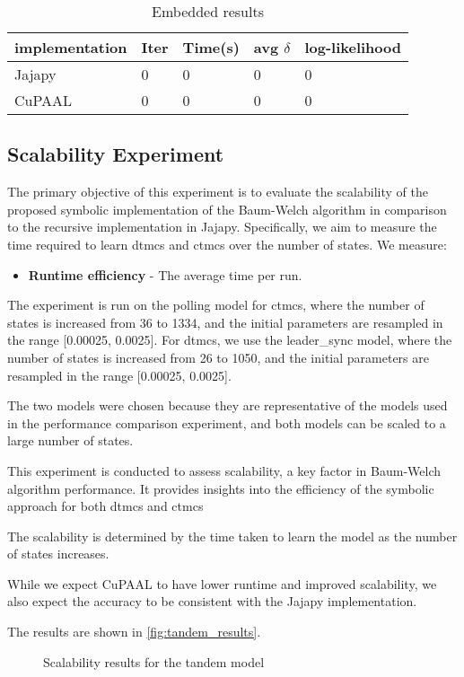 \begin{table}[!htb]
    \centering
    \caption{Embedded results}
    \label{tab:embedded_results}
    \begin{tabular}{lllll}
        \toprule
        implementation & Iter & Time(s) & avg $\delta$ & log-likelihood \\
        \midrule
        Jajapy         & 0    & 0       & 0            & 0              \\
        CuPAAL         & 0    & 0       & 0            & 0              \\
        \bottomrule
    \end{tabular}
\end{table}


\subsection{Scalability Experiment}
The primary objective of this experiment is to evaluate the scalability of the proposed symbolic implementation of the Baum-Welch algorithm in comparison to the recursive implementation in Jajapy. Specifically, we aim to measure the time required to learn \glspl{dtmc} and \glspl{ctmc} over the number of states.
We measure:
\begin{itemize}
    \item \textbf{Runtime efficiency} - The average time per run.
\end{itemize}

The experiment is run on the polling model for \glspl{ctmc}, where the number of states is increased from 36 to 1334, and the initial parameters are resampled in the range [0.00025, 0.0025].
For \glspl{dtmc}, we use the leader\_sync model, where the number of states is increased from 26 to 1050, and the initial parameters are resampled in the range [0.00025, 0.0025].

The two models were chosen because they are representative of the models used in the performance comparison experiment, and both models can be scaled to a large number of states.

This experiment is conducted to assess scalability, a key factor in Baum-Welch algorithm performance. It provides insights into the efficiency of the symbolic approach for both \glspl{dtmc} and \glspl{ctmc}

The scalability is determined by the time taken to learn the model as the number of states increases.

While we expect CuPAAL to have lower runtime and improved scalability, we also expect the accuracy to be consistent with the Jajapy implementation.

The results are shown in \autoref{fig:tandem_results}.

\begin{figure}
    \centering
    \caption{Scalability results for the tandem model}
    \label{fig:tandem_results}
\end{figure}